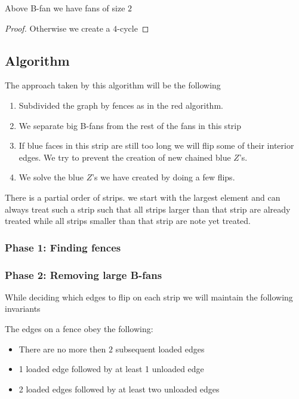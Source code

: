   \begin{lemma}
    \label{lm:}
    Above B-fan we have fans of size $2$
  \end{lemma}
  \begin{proof}
    Otherwise we create a $4$-cycle
  \end{proof}


\subsection{Algorithm}

The approach taken by this algorithm will be the following
\begin{enumerate}
  \item Subdivided the graph by fences as in the red algorithm.
  \item We separate big B-fans from the rest of the fans in this strip
  \item If blue faces  in this strip are still too long we will flip some of their interior edges. We try to prevent the creation of new chained blue $Z$'s.
  \item We solve the blue $Z$'s we have created by doing a few flips.
\end{enumerate}

There is a partial order of strips. we start with the largest element and can always treat such a strip such that all strips larger than that strip are already treated while all strips smaller than that strip are note yet treated.




\subsubsection{Phase 1: Finding fences}


\subsubsection{Phase 2: Removing large B-fans}

While deciding which edges to flip on each strip we will maintain the following invariants

\begin{invariants}
  \label{inv:uni:load}
  \item The edges on a fence obey the following:
  \begin{itemize}
    \item There are no more then $2$ subsequent loaded edges
    \item 1 loaded edge followed by at least 1 unloaded edge
    \item 2 loaded edges followed by at least two unloaded edges
  \end{itemize}
\end{invariants}


